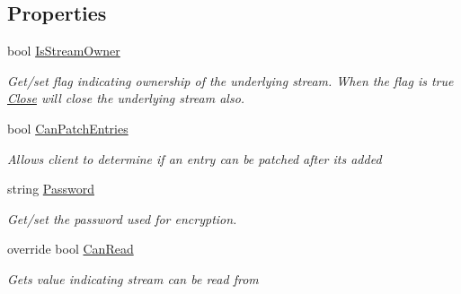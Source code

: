 \subsection*{Properties}
\begin{DoxyCompactItemize}
\item 
bool \hyperlink{class_i_c_sharp_code_1_1_sharp_zip_lib_1_1_zip_1_1_compression_1_1_streams_1_1_deflater_output_stream_a741aa9d79b2ebbb0fcd88d951935fd88}{Is\+Stream\+Owner}
\begin{DoxyCompactList}\small\item\em Get/set flag indicating ownership of the underlying stream. When the flag is true \hyperlink{class_i_c_sharp_code_1_1_sharp_zip_lib_1_1_zip_1_1_compression_1_1_streams_1_1_deflater_output_stream_a9c7b7ad6415b77846d1a68e87ae55b8e}{Close} will close the underlying stream also. \end{DoxyCompactList}\item 
bool \hyperlink{class_i_c_sharp_code_1_1_sharp_zip_lib_1_1_zip_1_1_compression_1_1_streams_1_1_deflater_output_stream_a63260b288f52fed18e9405f2ecfb291e}{Can\+Patch\+Entries}
\begin{DoxyCompactList}\small\item\em Allows client to determine if an entry can be patched after its added \end{DoxyCompactList}\item 
string \hyperlink{class_i_c_sharp_code_1_1_sharp_zip_lib_1_1_zip_1_1_compression_1_1_streams_1_1_deflater_output_stream_af1dc0690fda59b102641e89aaa517528}{Password}
\begin{DoxyCompactList}\small\item\em Get/set the password used for encryption. \end{DoxyCompactList}\item 
override bool \hyperlink{class_i_c_sharp_code_1_1_sharp_zip_lib_1_1_zip_1_1_compression_1_1_streams_1_1_deflater_output_stream_a0b9475bf53560547d847c6b6f898dc95}{Can\+Read}
\begin{DoxyCompactList}\small\item\em Gets value indicating stream can be read from \end{DoxyCompactList}\item 

\end{DoxyCompactItemize}
